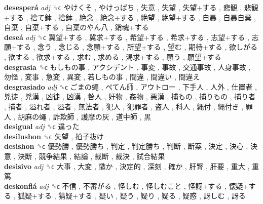\textbf{desesperá} \emph{adj}  ␝ϲ   やけくそ ,  やけっぱち ,  失意 ,  失望 ,  失望+する ,  悲観 ,  悲観+する ,  捨て鉢 ,  捨鉢 ,  絶念 ,  絶念+する ,  絶望 ,  絶望+する ,  自暴 ,  自暴自棄 ,  自棄 ,  自棄+する ,  自棄のやん八 ,  銷魂+する   \\
\textbf{deseá} \emph{adj}  ␝ϲ   冀望+する ,  冀求+する ,  希望+する ,  希求+する ,  志望+する ,  志願+する ,  念う ,  念じる ,  念願+する ,  所望+する ,  望む ,  期待+する ,  欲しがる ,  欲する ,  欲求+する ,  求む ,  求める ,  渇求+する ,  願う ,  願望+する   \\
\textbf{desgrasia} ␝ϲ   もしもの事 ,  アクシデント ,  事変 ,  事故 ,  交通事故 ,  人身事故 ,  勿怪 ,  変事 ,  急変 ,  異変 ,  若しもの事 ,  間違 ,  間違い ,  間違え   \\
\textbf{desgrasiado} \emph{adj}  ␝ϲ   ごまの蠅 ,  ぺてん師 ,  アウトロー ,  下手人 ,  人外 ,  仕置者 ,  兇徒 ,  兇漢 ,  凶徒 ,  凶漢 ,  咎人 ,  奸物 ,  姦物 ,  悪漢 ,  捕もの ,  捕りもの ,  捕り者 ,  捕者 ,  溢れ者 ,  溢者 ,  無法者 ,  犯人 ,  犯罪者 ,  盗人 ,  科人 ,  縄付 ,  縄付き ,  罪人 ,  胡麻の蠅 ,  詐欺師 ,  護摩の灰 ,  道中師 ,  黒   \\
\textbf{desigual} \emph{adj}  ␝ϲ   違った   \\
\textbf{desilushon} ␝ϲ   失望 ,  拍子抜け   \\
\textbf{desishon} ␝ϲ   優勢勝 ,  優勢勝ち ,  判定 ,  判定勝ち ,  判断 ,  断案 ,  決定 ,  決心 ,  決意 ,  決断 ,  競争結果 ,  結論 ,  裁断 ,  裁決 ,  試合結果   \\
\textbf{desisivo} \emph{adj}  ␝ϲ   大事 ,  大変 ,  慥か ,  決定的 ,  深刻 ,  確か ,  肝腎 ,  肝要 ,  重大 ,  重篤   \\
\textbf{deskonfiá} \emph{adj}  ␝ϲ   不信 ,  不審がる ,  怪しむ ,  怪しむこと ,  怪訝+する ,  懐疑+する ,  狐疑+する ,  猜疑+する ,  疑い ,  疑う ,  疑り ,  疑る ,  疑惑 ,  訝しむ ,  訝る   \\
